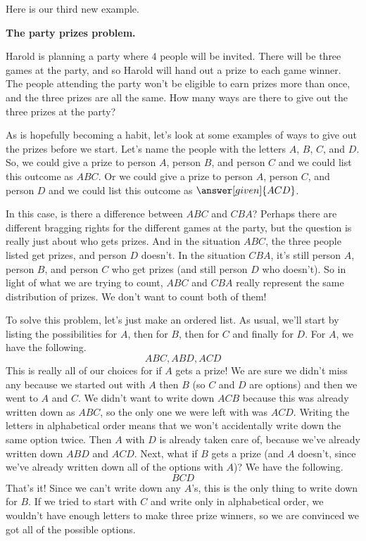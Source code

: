 \documentclass{ximera}
\begin{document}
Here is our third new example. 
\begin{question}
{\bf The party prizes problem.}

Harold is planning a party where $4$ people will be invited. There will be three games at the party, and so Harold will hand out a prize to each game winner. The people attending the party won't be eligible to earn prizes more than once, and the three prizes are all the same. How many ways are there to give out the three prizes at the party?

\begin{explanation}
As is hopefully becoming a habit, let's look at some examples of ways to give out the prizes before we start. Let's name the people with the letters $A$, $B$, $C$, and $D$. So, we could give a prize to person $A$, person $B$, and person $C$ and we could list this outcome as $ABC$. Or we could give a prize to person $A$, person $C$, and person $D$ and we could list this outcome as $\answer[given]{ACD}$. 

In this case, is there a difference between $ABC$ and $CBA$? Perhaps there are different bragging rights for the different games at the party, but the question is really just about who gets prizes. And in the situation $ABC$, the three people listed get prizes, and person $D$ doesn't. In the situation $CBA$, it's still person $A$, person $B$, and person $C$ who get prizes (and still person $D$ who doesn't). So in light of what we are trying to count, $ABC$ and $CBA$ really represent the same distribution of prizes. We don't want to count both of them!

To solve this problem, let's just make an ordered list. As usual, we'll start by listing the possibilities for $A$, then for $B$, then for $C$ and finally for $D$. For $A$, we have the following.
\[
ABC, ABD, ACD
\]
This is really all of our choices for if $A$ gets a prize! We are sure we didn't miss any because we started out with $A$ then $B$ (so $C$ and $D$ are options) and then we went to $A$ and $C$. We didn't want to write down $ACB$ because this was already written down as $ABC$, so the only one we were left with was $ACD$. Writing the letters in alphabetical order means that we won't accidentally write down the same option twice. Then $A$ with $D$ is already taken care of, because we've already written down $ABD$ and $ACD$. Next, what if $B$ gets a prize (and $A$ doesn't, since we've already written down all of the options with $A$)? We have the following.
\[
BCD
\]
That's it! Since we can't write down any $A$'s, this is the only thing to write down for $B$. If we tried to start with $C$ and write only in alphabetical order, we wouldn't have enough letters to make three prize winners, so we are convinced we got all of the possible options.



\end{explanation}
\end{question}
\end{document}
